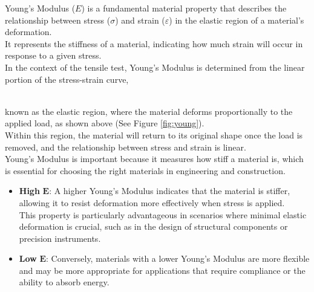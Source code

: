 \documentclass{article}
\begin{document}
{\begin{minipage}{\dimexpr\textwidth-0.55\textwidth\relax}
    {Young's Modulus} ($E$) is a fundamental material property that describes the relationship between stress ($\sigma$) and strain ($\varepsilon$) in the elastic region of a material's deformation.\\[8pt]
    It represents the stiffness of a material, indicating how much strain will occur in response to a given stress.\\
    
    In the context of the tensile test, Young's Modulus is determined from the linear portion of the stress-strain curve,
\end{minipage}}\\[4pt]
    known as the elastic region, where the material deforms proportionally to the applied load, as shown above (See Figure \ref{fig:young}).\\[8pt]
    Within this region, the material will return to its original shape once the load is removed, and the relationship between stress and strain is linear.\\[8pt]
    Young's Modulus is important because it measures how stiff a material is, which is essential for choosing the right materials in engineering and construction.
    \begin{itemize}
        \item \textbf{High }\(\bm{E}\): A higher Young's Modulus indicates that the material is stiffer, allowing it to resist deformation more effectively when stress is applied.\\[3pt] 
        This property is particularly advantageous in scenarios where minimal elastic deformation is crucial, such as in the design of structural components or precision instruments.
        \item \textbf{Low }\(\bm{E}\): Conversely, materials with a lower Young's Modulus are more flexible and may be more appropriate for applications that require compliance or the ability to absorb energy.
    \end{itemize}    

    \newpage
\end{document}
